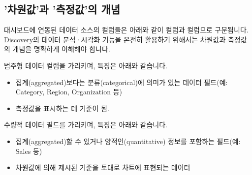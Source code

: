 \documentclass[letterpaper,10pt,english]{sphinxmanual}
\begin{document}
\subsection{'차원값'과 '측정값'의 개념}
\label{\detokenize{discovery/part02/dimension_and_measures:id1}}\label{\detokenize{discovery/part02/dimension_and_measures::doc}}
대시보드에 연동된 데이터 소스의 컬럼들은 아래와 같이  컬럼과  컬럼으로 구분됩니다. Discovery의 데이터 분석·시각화 기능을 온전히 활용하기 위해서는 차원값과 측정값의 개념을 명확하게 이해해야 합니다.
\begin{quote}

\begin{figure}[H]
\centering

\noindent{}
\end{figure}
\end{quote}


범주형 데이터 컬럼을 가리키며, 특징은 아래와 같습니다.
\begin{itemize}
\item {} 
집계(aggregated)보다는 분류(categorical)에 의미가 있는 데이터 필드(예: Category, Region, Organization 등)

\item {} 
측정값을 표시하는 데 기준이 됨.

\end{itemize}


수량적 데이터 필드를 가리키며, 특징은 아래와 같습니다.
\begin{itemize}
\item {} 
집계(aggregated)할 수 있거나 양적인(quantitative) 정보를 포함하는 필드(예: Sales 등)

\item {} 
차원값에 의해 제시된 기준을 토대로 차트에 표현되는 데이터

\end{itemize}
\end{document}
